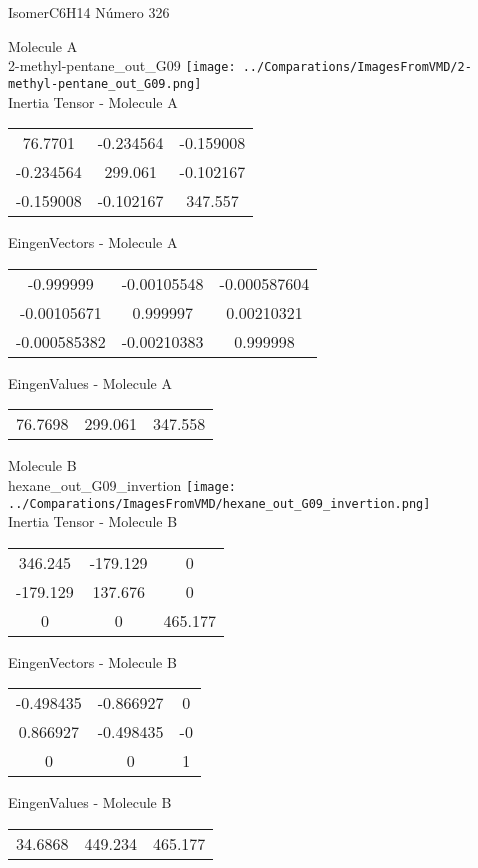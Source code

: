 \vtab[-2cm]
\begin{center}
{\large IsomerC6H14 \tab Número 326}
\end{center}
\begin{multicols}{2}
\begin{center}

Molecule A \\ 
2-methyl-pentane\_out\_G09
\texttt{[image: ../Comparations/ImagesFromVMD/2-methyl-pentane\_out\_G09.png]}
\\
Inertia Tensor - Molecule A \\
\vtab

\begin{tabular}{|c c c|}
76.7701	 & 	-0.234564	 & 	-0.159008	 \\
-0.234564	 & 	299.061	 & 	-0.102167	 \\
-0.159008	 & 	-0.102167	 & 	347.557
\end{tabular}

\vtab
 EingenVectors - Molecule A     \\
\vtab
\begin{tabular}{|c c c|}
-0.999999	 & 	-0.00105548	 & 	-0.000587604	 \\
-0.00105671	 & 	0.999997	 & 	0.00210321	 \\
-0.000585382	 & 	-0.00210383	 & 	0.999998
\end{tabular}

\vtab
 EingenValues - Molecule A     \\
\vtab
\begin{tabular}{|c c c|}
76.7698	 & 	299.061	 & 	347.558	 \\
\end{tabular}
\columnbreak

Molecule B \\ 
hexane\_out\_G09\_invertion
\texttt{[image: ../Comparations/ImagesFromVMD/hexane\_out\_G09\_invertion.png]}
\\
Inertia Tensor - Molecule B \\
\vtab

\begin{tabular}{|c c c|}
346.245	 & 	-179.129	 & 	0	 \\
-179.129	 & 	137.676	 & 	0	 \\
0	 & 	0	 & 	465.177
\end{tabular}

\vtab
 EingenVectors - Molecule B     \\
\vtab
\begin{tabular}{|c c c|}
-0.498435	 & 	-0.866927	 & 	0	 \\
0.866927	 & 	-0.498435	 & 	-0	 \\
0	 & 	0	 & 	1
\end{tabular}

\vtab
 EingenValues - Molecule B     \\
\vtab
\begin{tabular}{|c c c|}
34.6868	 & 	449.234	 & 	465.177	 \\
\end{tabular}

\end{center}
\end{multicols}
